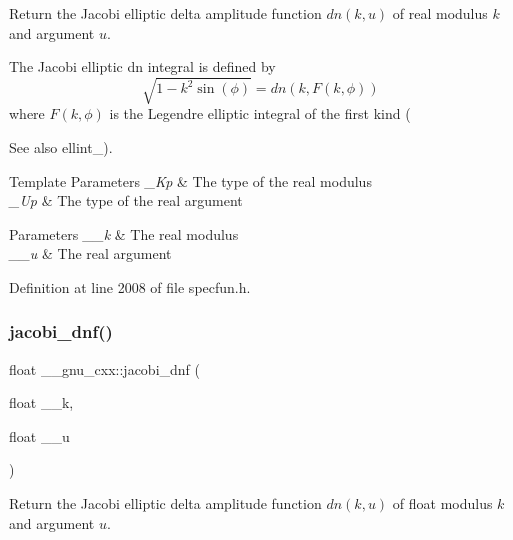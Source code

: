 Return the Jacobi elliptic delta amplitude function $ dn(k,u) $ of real modulus $ k $ and argument $ u $.

The Jacobi elliptic {\ttfamily dn} integral is defined by \[ \sqrt{1 - k^2\sin(\phi)} = dn(k, F(k,\phi)) \] where $ F(k,\phi) $ is the Legendre elliptic integral of the first kind (\begin{DoxySeeAlso}{See also}
ellint\+\_).
\end{DoxySeeAlso}

\begin{DoxyTemplParams}{Template Parameters}
{\em \+\_\+\+Kp} & The type of the real modulus \\
\hline
{\em \+\_\+\+Up} & The type of the real argument \\
\hline
\end{DoxyTemplParams}

\begin{DoxyParams}{Parameters}
{\em \+\_\+\+\_\+k} & The real modulus \\
\hline
{\em \+\_\+\+\_\+u} & The real argument \\
\hline
\end{DoxyParams}


Definition at line 2008 of file specfun.\+h.

\mbox{\label{group__gnu__math__spec__func_gae96327d678adc6b5c4051f1c3649549a}} 
\subsubsection{\texorpdfstring{jacobi\+\_\+dnf()}{jacobi\_dnf()}}
{\footnotesize\ttfamily float \+\_\+\+\_\+gnu\+\_\+cxx\+::jacobi\+\_\+dnf (\begin{DoxyParamCaption}\item[{float}]{\+\_\+\+\_\+k,  }\item[{float}]{\+\_\+\+\_\+u }\end{DoxyParamCaption})\hspace{0.3cm}{\ttfamily [inline]}}

Return the Jacobi elliptic delta amplitude function $ dn(k,u) $ of {\ttfamily float} modulus $ k $ and argument $ u $.

